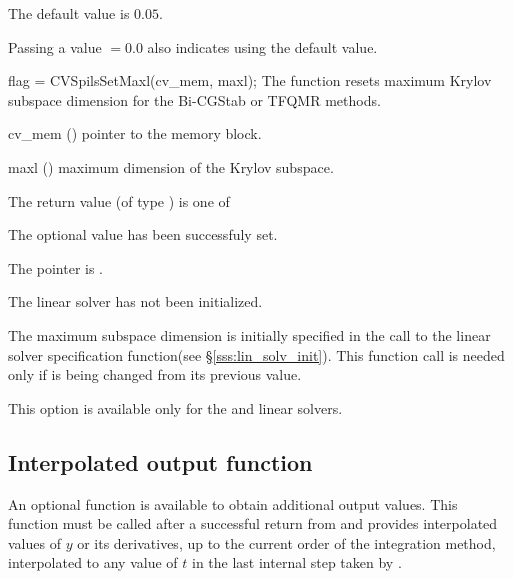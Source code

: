 {
  The default value is $0.05$.

  Passing a value $ = 0.0$ also indicates using the default value.
}
{
  flag = CVSpilsSetMaxl(cv\_mem, maxl);
}
{
  The function  resets maximum Krylov subspace
  dimension for the Bi-CGStab or TFQMR 
  methods.
}
{
  \begin{args}[cv\_mem]
  \item[cv\_mem] ()
    pointer to the {\cvodes} memory block.
  \item[maxl] ()
    maximum dimension of the Krylov subspace.
  \end{args}
}
{
  The return value  (of type ) is one of
  \begin{args}
  \item[\Id{CVSPILS\_SUCCESS}] 
    The optional value has been successfuly set.
  \item[\Id{CVSPILS\_MEM\_NULL}]
    The  pointer is .
  \item[\Id{CVSPILS\_LMEM\_NULL}]
    The {\cvspbcg} linear solver has not been initialized.
  \end{args}
}
{
  The maximum subspace dimension is initially specified in the call
  to the linear solver specification function(see \S\ref{sss:lin_solv_init}). 
  This function call is needed only if  is being changed from its 
  previous value.

  {\warn}This option is available only for the {\cvspbcg} and {\cvsptfqmr} linear solvers.
}

\subsection{Interpolated output function}\label{ss:optional_dky}

An optional function  is available to obtain additional output
values.  This function must be called after a successful return from 
and provides interpolated values of $y$ or its derivatives, up to the current
order of the integration method, interpolated to any value of $t$ in the last
internal step taken by {\cvode}.

